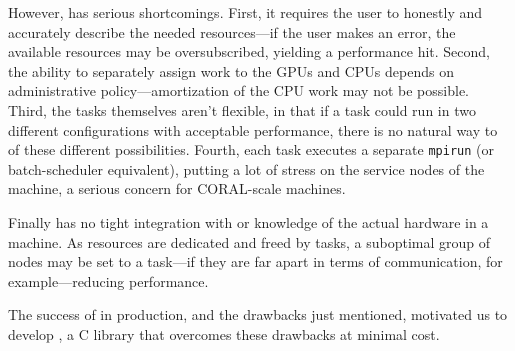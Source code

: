 However, \metaq has serious shortcomings.
First, it requires the user to honestly and accurately describe the needed resources---if the user makes an error, the available resources may be oversubscribed, yielding a performance hit.
Second, the ability to separately assign work to the GPUs and CPUs depends on administrative policy---amortization of the CPU work may not be possible.
Third, the tasks themselves aren't flexible, in that if a task could run in two different configurations with acceptable performance, there is no natural way to \metaq of these different possibilities.
Fourth, each task executes a separate \texttt{mpirun} (or batch-scheduler equivalent), putting a lot of stress on the service nodes of the machine, a serious concern for CORAL-scale machines.

Finally \metaq has no tight integration with or knowledge of the actual hardware in a machine.
As resources are dedicated and freed by tasks, a suboptimal group of nodes may be set to a task---if they are far apart in terms of communication, for example---reducing performance.

The success of \metaq in production, and the drawbacks just mentioned, motivated us to develop \mpijm, a C library that overcomes these drawbacks at minimal cost.
